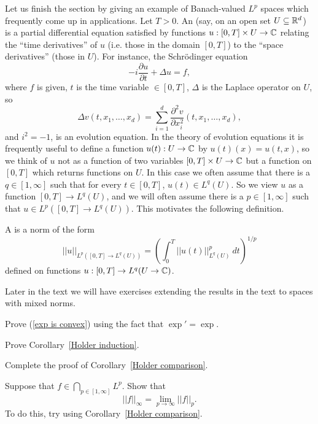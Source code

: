 Let us finish the section by giving an example of Banach-valued $L^p$ spaces which frequently come up in applications.
Let $T > 0$. An  (say, on an open set $U \subseteq \mathbb{R}^d$) is a partial differential equation satisfied by functions $u: [0, T] \times U \to \mathbb{C}$ relating the ``time derivatives'' of $u$ (i.e. those in the domain $[0, T]$) to the ``space derivatives'' (those in $U$).
For instance, the Schr\"odinger equation
\[-i\frac{\partial u}{\partial t} + \Delta u = f,\]
where $f$ is given, $t$ is the time variable $\in [0, T]$, $\Delta$ is the Laplace operator on $U$, so
\[\Delta v(t, x_1, \dots, x_d) = \sum_{i=1}^{d} \frac{\partial^2 v}{\partial x_i^2} (t, x_1, \dots, x_d), \]
and $i^2 = -1$, is an evolution equation.
In the theory of evolution equations it is frequently useful to define a function $u(t): U \to \mathbb{C}$ by $u(t)(x) = u(t, x)$, so we think of $u$ not as a function of two variables $[0, T] \times U \to \mathbb{C}$ but a function on $[0, T]$ which returns functions on $U$.
In this case we often assume that there is a $q \in [1, \infty]$ such that for every $t \in [0, T]$, $u(t) \in L^q(U)$.
So we view $u$ as a function $[0, T] \to L^q(U)$, and we will often assume there is a $p \in [1, \infty]$ such that $u \in L^p([0, T] \to L^q(U))$.
This motivates the following definition.

\begin{definition}
A  is a norm of the form
\[||u||_{L^p([0, T] \to L^q(U))} = \left(\int_0^{T} ||u(t)||_{L^q(U)}^p~dt\right)^{1/p}\]
defined on functions $u: [0, T] \to L^q(U \to \mathbb{C})$.
\end{definition}

Later in the text we will have exercises extending the results in the text to spaces with mixed norms.

\begin{exercise}\label{exp is convex exer}
Prove (\ref{exp is convex}) using the fact that $\exp' = \exp$.
\end{exercise}

\begin{exercise}\label{Holder induction exer}
Prove Corollary~\ref{Holder induction}.
\end{exercise}

\begin{exercise}\label{granular comparison}
Complete the proof of Corollary~\ref{Holder comparison}.
\end{exercise}

\begin{exercise}
Suppose that $f \in \bigcap_{p \in [1, \infty]} L^p$. Show that
\[||f||_{\infty} = \lim_{p \to \infty} ||f||_{p} .\]
To do this, try using Corollary~\ref{Holder comparison}.
\end{exercise}

